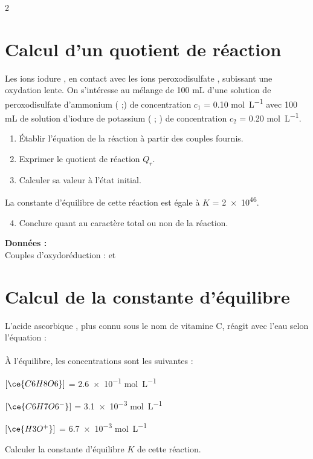 \documentclass[a4paper,11pt,fleqn]{article}%
\begin{document}
\maketitle

\begin{multicols}{2}
\section{Calcul d'un quotient de réaction}
Les ions iodure , en contact avec les ions peroxodisulfate , subissant une oxydation lente. On s'intéresse au mélange de \num{100} \unit{\milli \liter} d'une solution de peroxodisulfate d'ammonium ( ;) de concentration $c_1$ = \num{0,10} \unit{\mole \per \liter} avec \num{100} \unit{\milli \liter} de solution d'iodure de potassium ( ; ) de concentration $c_2$ = \num{0,20} \unit{\mole \per \liter}.
\begin{enumerate}
	\item Établir l'équation de la réaction à partir des couples fournis.
	\item Exprimer le quotient de réaction $Q_r$.
	\item Calculer sa valeur à l'état initial.
\end{enumerate}
La constante d'équilibre de cette réaction est égale à $K$ = \num{2e46}.
\begin{enumerate}
\setcounter{enumi}{3}
	\item Conclure quant au caractère total ou non de la réaction.
\end{enumerate}
\textbf{Données :}\\
Couples d'oxydoréduction :  et 

\section{Calcul de la constante d'équilibre}
L'acide ascorbique , plus connu sous le nom de vitamine C, réagit avec l'eau selon l'équation : \\
\\
À l'équilibre, les concentrations sont les suivantes :
\begin{itemize*}
	\item $[\ce{C6H8O6}]$ = \num{2,6e-1} \unit{\mole \per \liter}
	\item $[\ce{C6H7O6^{-}}]$ = \num{3,1e-3} \unit{\mole \per \liter}
	\item $[\ce{H3O^{+}}]$ = \num{6,7e-3} \unit{\mole \per \liter}
\end{itemize*}
Calculer la constante d'équilibre $K$ de cette réaction.


\end{multicols}
\end{document}

